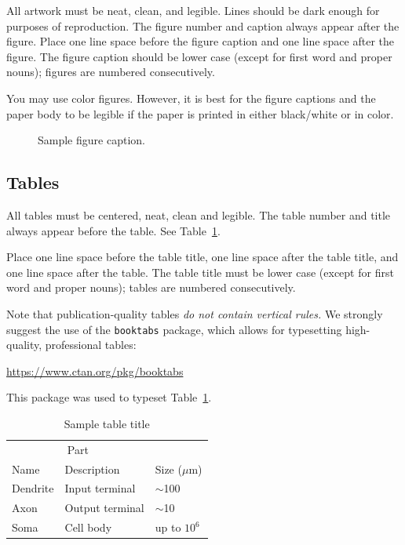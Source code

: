 \documentclass{article}
\begin{document}
All artwork must be neat, clean, and legible. Lines should be dark
enough for purposes of reproduction. The figure number and caption
always appear after the figure. Place one line space before the figure
caption and one line space after the figure. The figure caption should
be lower case (except for first word and proper nouns); figures are
numbered consecutively.

You may use color figures.  However, it is best for the figure
captions and the paper body to be legible if the paper is printed in
either black/white or in color.
\begin{figure}[h]
  \centering
  \fbox{\rule[-.5cm]{0cm}{4cm} \rule[-.5cm]{4cm}{0cm}}
  \caption{Sample figure caption.}
\end{figure}

\subsection{Tables}

All tables must be centered, neat, clean and legible.  The table
number and title always appear before the table.  See
Table~\ref{sample-table}.

Place one line space before the table title, one line space after the
table title, and one line space after the table. The table title must
be lower case (except for first word and proper nouns); tables are
numbered consecutively.

Note that publication-quality tables \emph{do not contain vertical
  rules.} We strongly suggest the use of the \verb+booktabs+ package,
which allows for typesetting high-quality, professional tables:
\begin{center}
  \url{https://www.ctan.org/pkg/booktabs}
\end{center}
This package was used to typeset Table~\ref{sample-table}.

\begin{table}[t]
  \caption{Sample table title}
  \label{sample-table}
  \centering
  \begin{tabular}{lll}
    \toprule
    \multicolumn{2}{c}{Part}                   \\
    \cmidrule{1-2}
    Name     & Description     & Size ($\mu$m) \\
    \midrule
    Dendrite & Input terminal  & $\sim$100     \\
    Axon     & Output terminal & $\sim$10      \\
    Soma     & Cell body       & up to $10^6$  \\
    \bottomrule
  \end{tabular}
\end{table}
\end{document}
